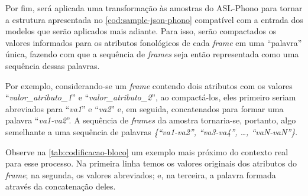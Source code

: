 
Por fim, será aplicada uma transformação às amostras do ASL-Phono para tornar a estrutura apresentada no \autoref{cod:sample-json-phono} compatível com a entrada dos modelos que serão aplicados mais adiante.
Para isso, serão compactados os valores informados para os atributos fonológicos de cada \textit{frame} em uma ``palavra'' única, fazendo com que a sequência de \textit{frames} seja então representada como uma sequência dessas palavras.

Por exemplo, considerando-se um \textit{frame} contendo dois atributos com os valores ``\textit{valor\_atributo\_1}'' e ``\textit{valor\_atributo\_2}'', ao compactá-los, eles primeiro seriam abreviados para ``\textit{va1}'' e ``\textit{va2}'' e, em seguida, concatenados para formar uma palavra ``\textit{va1-va2}''.  A sequência de \textit{frames} da amostra tornaria-se, portanto, algo semelhante a uma sequência de palavras \textit{\{``va1-va2'', ``va3-va4'', \dots, ``vaN-vaN''\}}.

Observe na \autoref{tab:codificacao-bloco} um exemplo mais próximo do contexto real para esse processo. Na primeira linha temos os valores originais dos atributos do \textit{frame}; na segunda, os valores abreviados; e, na terceira, a palavra formada através da concatenação deles.




